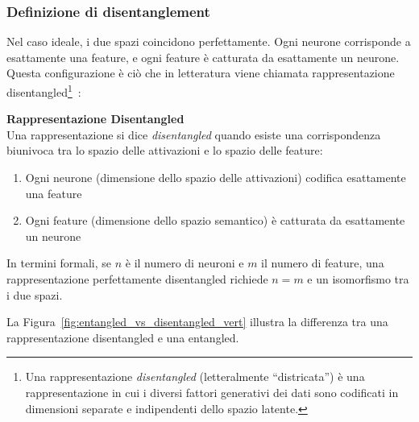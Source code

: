 \subsubsection{Definizione di disentanglement}
Nel caso ideale, i due spazi coincidono perfettamente. Ogni neurone corrisponde a esattamente una feature, e ogni feature è catturata da esattamente un neurone. Questa configurazione è ciò che in letteratura viene chiamata rappresentazione disentangled\footnote{Una rappresentazione \textit{disentangled} (letteralmente ``districata'') è una rappresentazione in cui i diversi fattori generativi dei dati sono codificati in dimensioni separate e indipendenti dello spazio latente.}~\parencite{wang2024disentangledrepresentationlearning}:
\begin{notebox}
\textbf{Rappresentazione Disentangled}\\
Una rappresentazione si dice \textit{disentangled} quando esiste una corrispondenza biunivoca tra lo spazio delle attivazioni e lo spazio delle feature:
\begin{enumerate}
    \item Ogni neurone (dimensione dello spazio delle attivazioni) codifica esattamente una feature
    \item Ogni feature (dimensione dello spazio semantico) è catturata da esattamente un neurone
\end{enumerate}
In termini formali, se $n$ è il numero di neuroni e $m$ il numero di feature, una rappresentazione perfettamente disentangled richiede $n = m$ e un isomorfismo tra i due spazi.
\end{notebox}
La Figura~\ref{fig:entangled_vs_disentangled_vert} illustra la differenza tra una rappresentazione disentangled e una entangled.
